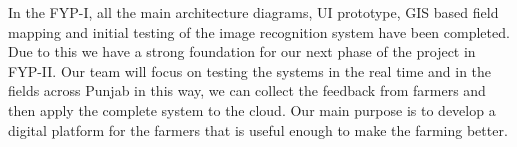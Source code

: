\documentclass{FastFyp}
\begin{document}
In the FYP-I, all the main architecture diagrams, UI prototype, GIS based field mapping  and initial testing of the image recognition system have been completed. Due to this we have a strong foundation for our next phase of the project in FYP-II. Our team will focus on testing the systems in the real time and in the fields across Punjab in this way, we can collect the feedback from farmers and then apply the complete system to the cloud. Our main purpose is to develop a digital platform for the farmers that is useful enough to make the farming better.

{
	
}
\end{document}
